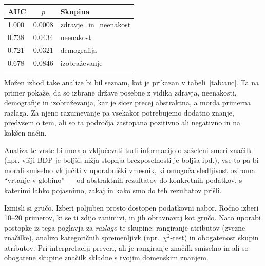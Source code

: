 \begin{margintable}
\caption{Obogatenost skupin značilk v socioekonomskih podatkih.}
\centering
\small
\begin{tabular}{lcl}
\toprule
AUC & $p$ & Skupina \\
\midrule
1.000 & 0.0008 & zdravje\_in\_neenakost \\
0.738 & 0.0434 & neenakost \\
0.721 & 0.0321 & demografija \\
0.678 & 0.0846 & izobraževanje \\
\bottomrule
\end{tabular}
\label{tab:auc}
\end{margintable}

Možen izhod take analize bi bil seznam, kot je prikazan v tabeli~\ref{tab:auc}. Ta na primer pokaže, da so izbrane države posebne z vidika zdravja, neenakosti, demografije in izobraževanja, kar je sicer precej abstraktna, a morda primerna razlaga. Za njeno razumevanje pa vsekakor potrebujemo dodatno znanje, predvsem o tem, ali so ta področja zastopana pozitivno ali negativno in na kakšen način. 

Analiza 
%
%
te vrste bi morala vključevati tudi informacijo o zaželeni smeri značilk (npr. višji BDP je boljši, nižja stopnja brezposelnosti je boljša ipd.), vse to pa bi morali smiselno vključiti v uporabniški vmesnik, ki omogoča sledljivost oziroma ``vrtanje v globino'' --- od abstraktnih rezultatov do konkretnih podatkov, s katerimi lahko pojasnimo, zakaj in kako smo do teh rezultatov prišli.
%

%
%
\begin{exercise}{Izmisli si gručo.}
Izberi poljuben prosto dostopen podatkovni nabor. Ročno izberi 10--20 primerov, ki se ti zdijo zanimivi, in jih obravnavaj kot gručo. Nato uporabi postopke iz tega poglavja za \emph{razlago} te skupine: rangiranje atributov (zvezne značilke), analizo kategoričnih spremenljivk (npr.\ \(\chi^2\)-test) in obogatenost skupin atributov. Pri interpretaciji preveri, ali je rangiranje značilk smiselno in ali so obogatene skupine značilk skladne s tvojim domenskim znanjem. 
\end{exercise}

